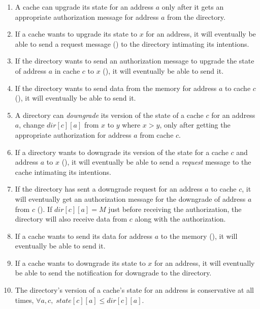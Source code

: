 
\begin{enumerate}
\item A cache can upgrade its state for an address $a$ only after it gets an
appropriate authorization message for address $a$ from the directory.
\item If a cache wants to upgrade its state to $x$ for an address, it will
eventually be able to send a request message () to the directory
intimating its intentions. \label{csendreq}
\item If the directory wants to send an authorization message to upgrade the
state of address $a$ in cache $c$ to $x$ (), it will eventually
be able to send it. \label{dsendresp}
\item If the directory wants to send data from the memory for address $a$ to
cache $c$ (), it will eventually be able to send it.
\label{dsenddata}
\item A directory can \emph{downgrade} its version of the state of a cache $c$
for an address $a$, \ie change $dir[c][a]$ from $x$ to $y$ where $x > y$, only
after getting the appropriate authorization for address $a$ from cache $c$.
\item If a directory wants to downgrade its version of the state for a cache $c$
and address $a$ to $x$ (), it will eventually be able to send a
\emph{request} message to the cache intimating its intentions. \label{dsendreq}
\item If the directory has sent a downgrade request for an address $a$ to cache
$c$, it will eventually get an authorization message for the downgrade of
address $a$ from $c$ (). If $dir[c][a] = M$ just before
receiving the authorization, the directory will also receive data from $c$ along
with the authorization. \label{drecvresp}
\item If a cache wants to send its data for address $a$ to the memory
(), it will eventually be able to send it. \label{csenddata}
\item If a cache wants to downgrade its state to $x$ for an address, it will
eventually be able to send the notification for downgrade to the directory.
\item The directory's version of a cache's state for an address is conservative
at all times, \ie $\forall a, c,\; state[c][a] \le dir[c][a]$. \label{conservative}
\end{enumerate}


